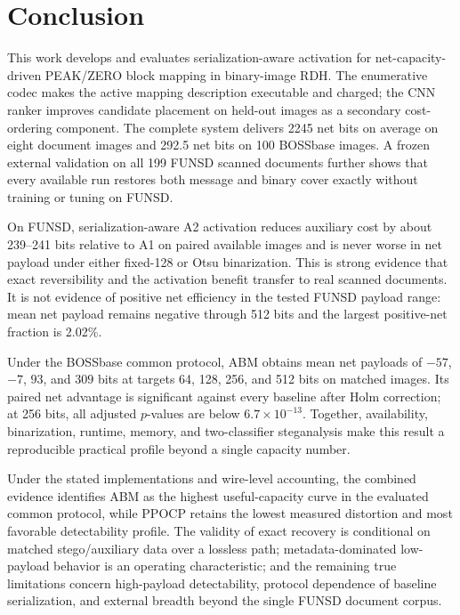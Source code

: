\section{Conclusion}
\label{sec:conclusion}

\RevisionAddBegin
This work develops and evaluates serialization-aware activation for
net-capacity-driven PEAK/ZERO block mapping in binary-image RDH. The
enumerative codec makes the active mapping description executable and charged;
the CNN ranker improves candidate placement on held-out images as a secondary
cost-ordering component. The complete system delivers 2245 net bits on average
on eight document images and 292.5 net bits on 100 BOSSbase images. A frozen
external validation on all 199 FUNSD scanned documents further shows that every
available run restores both message and binary cover exactly without training
or tuning on FUNSD.

On FUNSD, serialization-aware A2 activation reduces auxiliary cost by about
239--241 bits relative to A1 on paired available images and is never worse in
net payload under either fixed-128 or Otsu binarization. This is strong evidence
that exact reversibility and the activation benefit transfer to real scanned
documents. It is not evidence of positive net efficiency in the tested FUNSD
payload range: mean net payload remains negative through 512 bits and the
largest positive-net fraction is 2.02\%.

Under the BOSSbase common protocol, ABM obtains mean net payloads of $-57$,
$-7$, $93$, and $309$ bits at targets 64, 128, 256, and 512 bits on matched
images. Its paired net advantage is significant against every baseline after
Holm correction; at 256 bits, all adjusted $p$-values are below
$6.7\times10^{-13}$. Together, availability, binarization, runtime, memory,
and two-classifier steganalysis make this result a reproducible practical
profile beyond a single capacity number.

Under the stated implementations and wire-level accounting, the combined
evidence identifies ABM as the highest useful-capacity curve in the evaluated
common protocol, while PPOCP retains the lowest measured distortion and most
favorable detectability profile. The validity of exact recovery is conditional
on matched stego/auxiliary data over a lossless path; metadata-dominated
low-payload behavior is an operating characteristic; and the remaining true
limitations concern high-payload detectability, protocol dependence of baseline
serialization, and external breadth beyond the single FUNSD document corpus.

